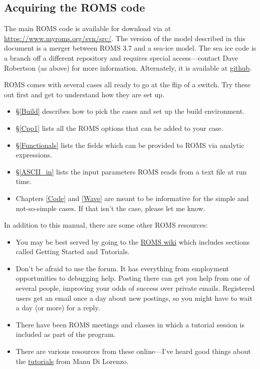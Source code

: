 \subsection{Acquiring the ROMS code}
The main ROMS code is available for download via  at
\url{https://www.myroms.org/svn/src/}.
The version of the model described in this document is a merger between
ROMS 3.7 and a sea-ice model.
The sea ice code is a branch off a different repository and requires
special access---contact Dave Robertson (as above) for more information.
Alternately, it is available at
\href{https://github.com/kshedstrom/roms}{github}.

ROMS comes with several cases all ready to go at the flip
of a switch. Try these out first and get to understand how they
are set up.
    \begin{itemize}
      \item \S\ref{Build} describes how to pick the cases and set up
      the build environment.
      \item \S\ref{Cpp1} lists all the ROMS options that can be
      added to your case.
      \item \S\ref{Functionals} lists the fields which can be
      provided to ROMS via analytic expressions.
      \item \S\ref{ASCII_in} lists the input parameters ROMS reads
      from a text file at run time.
      \item Chapters \ref{Code} and \ref{Wave} are meant to be
      informative for the simple and not-so-simple cases. If that
      isn't the case, please let me know.
    \end{itemize}
In addition to this manual, there are some other ROMS resources:
\begin{itemize}
   \item You may be best served by going to the 
\href{https://www.myroms.org/wiki/}{ROMS wiki} which includes
sections called Getting Started and Tutorials.
   \item Don't be afraid to use the forum. It has everything from
employment opportunities to debugging help. Posting there can get
you help from one of several people, improving your odds of success
over private emails. Registered users get an email once a day about
new postings, so you might have to wait a day (or more) for a reply.
   \item There have been ROMS meetings and classes in which a tutorial
session is included as part of the program.
   \item There are various resources
from these online---I've heard good things about the
\href{http://eros.eas.gatech.edu/ROMS-Tutorial/tutorials.html}{tutorials}
from Manu Di Lorenzo.
\end{itemize}

